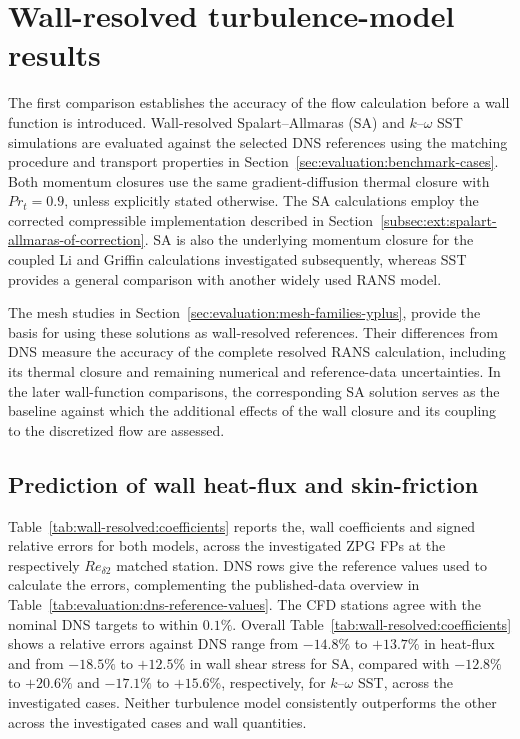 \section{Wall-resolved turbulence-model results}
\label{sec:comparative:zpg:wall-resolved-baselines}

The first comparison establishes the accuracy of the flow calculation before a wall function is introduced. Wall-resolved Spalart--Allmaras (SA) and \(k\)--\(\omega\) SST simulations are evaluated against the selected DNS references using the matching procedure and transport properties in Section~\ref{sec:evaluation:benchmark-cases}. Both momentum closures use the same gradient-diffusion thermal closure with \(Pr_t=0.9\), unless explicitly stated otherwise. The SA calculations employ the corrected compressible implementation described in Section~\ref{subsec:ext:spalart-allmaras-of-correction}. SA is also the underlying momentum closure for the coupled Li and Griffin calculations investigated subsequently, whereas SST provides a general comparison with another widely used RANS model.
\par\medskip

The mesh studies in Section~\ref{sec:evaluation:mesh-families-yplus}, provide the basis for using these solutions as wall-resolved references. Their differences from DNS measure the accuracy of the complete resolved RANS calculation, including its thermal closure and remaining numerical and reference-data uncertainties. In the later wall-function comparisons, the corresponding SA solution serves as the baseline against which the additional effects of the wall closure and its coupling to the discretized flow are assessed.

\subsection{Prediction of wall heat-flux and skin-friction}
\label{subsec:comparative:zpg:wr-wall-fluxes}

Table~\ref{tab:wall-resolved:coefficients} reports the, wall coefficients and signed relative errors for both models, across the investigated ZPG FPs at the respectively \(Re_{\delta2}\) matched station. DNS rows give the reference values used to calculate the errors, complementing the published-data overview in Table~\ref{tab:evaluation:dns-reference-values}. The CFD stations agree with the nominal DNS targets to within \(0.1\%\). Overall Table~\ref{tab:wall-resolved:coefficients} shows a relative errors against DNS range from \(-14.8\%\) to \(+13.7\%\) in heat-flux and from \(-18.5\%\) to \(+12.5\%\) in wall shear stress for SA, compared with \(-12.8\%\) to \(+20.6\%\) and \(-17.1\%\) to \(+15.6\%\), respectively, for \(k\)--\(\omega\) SST, across the investigated cases. Neither turbulence model consistently outperforms the other across the investigated cases and wall quantities.

